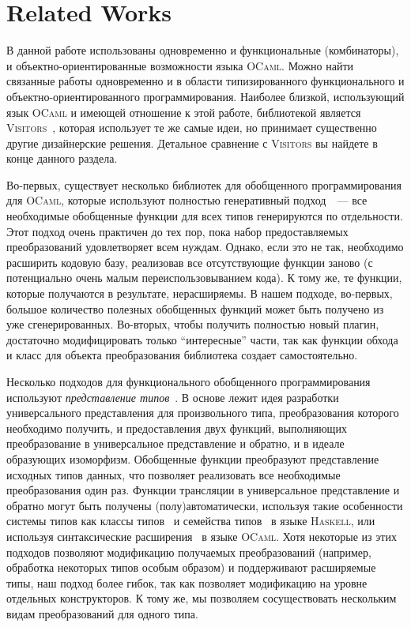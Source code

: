 \section{Related Works}
\label{sec:relatedworks}

В данной работе использованы одновременно и функциональные (комбинаторы), и объектно-ориентированные возможности языка \textsc{OCaml}. Можно найти связанные работы  одновременно и в области типизированного функционального и объектно-ориентированного программирования. Наиболее близкой, использующий язык \textsc{OCaml} и имеющей отношение к этой работе, библиотекой является \textsc{Visitors}~\cite{Visitors}, которая использует те же самые идеи, но принимает существенно другие дизайнерские решения. Детальное сравнение с \textsc{Visitors} вы найдете в конце данного раздела.

Во-первых, существует несколько библиотек для обобщенного программирования для \textsc{OCaml}, которые используют полностью генеративный подход~\cite{Yallop,PPXLib}~--- все необходимые обобщенные функции для всех типов генерируются по отдельности. Этот подход очень практичен до тех пор, пока набор предоставляемых преобразований удовлетворяет всем нуждам. Однако, если это не так, необходимо расширить кодовую базу, реализовав все отсутствующие функции заново
(с потенциально очень малым переиспользовыванием кода). К тому же, те функции,
которые получаются в результате, нерасширяемы. В нашем подходе, во-первых,
большое количество полезных обобщенных функций может быть получено из уже сгенерированных. Во-вторых, чтобы получить полностью новый плагин, достаточно модифицировать только ``интересные'' части, так как функции обхода и класс для объекта преобразования библиотека создает самостоятельно.

Несколько подходов для функционального обобщенного программирования используют 
\emph{представление типов}~\cite{Hinze}. В основе лежит идея разработки универсального представления для произвольного типа, преобразования которого необходимо получить, и предоставления двух функций, выполняющих преобразование в универсальное представление и обратно, и в идеале образующих изоморфизм. Обобщенные функции преобразуют представление исходных типов данных, что позволяет реализовать все необходимые преобразования один раз. Функции трансляции в универсальное представление и обратно могут быть получены (полу)автоматически, используя такие особенности системы типов  как классы типов~\cite{Hinze,ALaCarte} и семейства типов~\cite{InstantGenerics} в языке \textsc{Haskell}, или  используя синтаксические расширения~\cite{GenericOCaml} в языке \textsc{OCaml}. Хотя некоторые из этих подходов позволяют модификацию получаемых преобразований (например, обработка некоторых типов особым образом) и поддерживают расширяемые типы, наш подход более гибок, так как позволяет модификацию на уровне отдельных конструкторов. К тому же, мы позволяем сосуществовать нескольким видам преобразований для одного типа.

